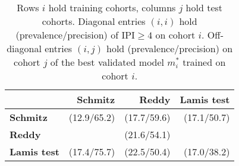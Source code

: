 \begin{table}[ht]
    \small
    \centering
    \begin{tabular}{lrrr}
        \hline
        & \textbf{Schmitz} & \textbf{Reddy} & \textbf{Lamis test} \\
        \hline
        \textbf{Schmitz} & (12.9/65.2) & (17.7/59.6) & (17.1/50.7) \\
        \textbf{Reddy} & & (21.6/54.1) & \\
        \textbf{Lamis test} & (17.4/75.7) & (22.5/50.4) & (17.0/38.2) \\
        \hline
    \end{tabular}
    \caption{Rows $i$ hold training cohorts, columns $j$ hold test cohorts. Diagonal 
        entries $(i, i)$ hold (prevalence/precision) of $\text{IPI} \geq 4$
        on cohort $i$. Off-diagonal entries $(i, j)$ hold (prevalence/precision) 
        on cohort $j$ of the best validated model $m^*_i$ trained on cohort $i$.}
    \label{tab:inter_trial}
\end{table}